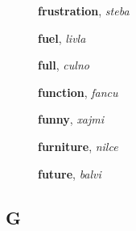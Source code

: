 \documentclass[12pt]{book}
\begin{document}
\begin{description}
\item[ ] \textbf{frustration}, \textit{steba}

\item[ ] \textbf{fuel}, \textit{livla}

\item[ ] \textbf{full}, \textit{culno}

\item[ ] \textbf{function}, \textit{fancu}

\item[ ] \textbf{funny}, \textit{xajmi}

\item[ ] \textbf{furniture}, \textit{nilce}

\item[ ] \textbf{future}, \textit{balvi}



\end{description}



\subsection{G} %
\end{document}

